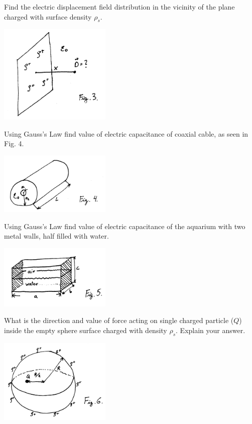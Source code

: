 \begin{Exercise}[difficulty=3]
Find the electric displacement field distribution in the vicinity of the plane charged with surface density $\rho_s$.
\begin{center}
\includegraphics[width=0.4\textwidth]{img/fig_e3.png} 
\end{center}
\end{Exercise}

\begin{Exercise}[difficulty=2]
Using Gauss's Law find value of electric capacitance of coaxial cable, as seen in Fig. 4.
\begin{center}
\includegraphics[width=0.4\textwidth]{img/fig_e4.png} 
\end{center}
\end{Exercise}

\begin{Exercise}[difficulty=3]
Using Gauss's Law find value of electric capacitance of the aquarium with two metal walls, half filled with water.
\begin{center}
\includegraphics[width=0.4\textwidth]{img/fig_e5.png} 
\end{center}
\end{Exercise}

\begin{Exercise}[difficulty=3]
What is the direction and value of force acting on single charged particle ($Q$) inside the empty sphere surface charged with density $\rho_s$. Explain your answer.
\begin{center}
\includegraphics[width=0.4\textwidth]{img/fig_e6.png} 
\end{center}
\end{Exercise}

